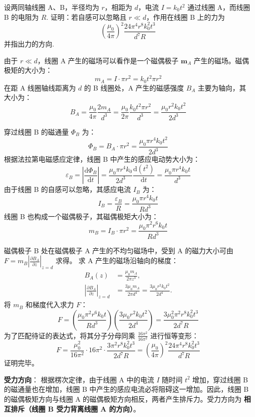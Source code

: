 \begin{exercise}\label{ex:18.5}
设两同轴线圈 A、B，半径均为 $r$，相距为 $d$，电流 $I = k_0 t^2$ 通过线圈 A，而线圈 B 的电阻为 $R$. 证明：若自感可以忽略且 $r \ll d$，作用在线圈 B 上的力为
$$ \left(\frac{\mu_0}{4\pi}\right)^2 \frac{24\pi^4 r^8 k_0^2 t^3}{d^7 R} $$
并指出力的方向.
\end{exercise}
\begin{solution}
由于 $r \ll d$，线圈 A 产生的磁场可以看作是一个磁偶极子 $\boldsymbol{m}_A$ 产生的磁场。磁偶极矩的大小为：
$$ m_A = I \cdot \pi r^2 = k_0 t^2 \pi r^2 $$
在距 A 线圈轴线距离为 $d$ 的 B 线圈处，A 产生的磁感强度 $B_A$ 主要为轴向，其大小为：
$$ B_A = \frac{\mu_0}{4\pi} \frac{2 m_A}{d^3} = \frac{\mu_0}{2\pi} \frac{k_0 t^2 \pi r^2}{d^3} = \frac{\mu_0 r^2 k_0 t^2}{2 d^3} $$

穿过线圈 B 的磁通量 $\Phi_B$ 为：
$$ \Phi_B = B_A \cdot \pi r^2 = \frac{\mu_0 \pi r^4 k_0 t^2}{2 d^3} $$
根据法拉第电磁感应定律，线圈 B 中产生的感应电动势大小为：
$$ \varepsilon_B = \left| \frac{\mathrm{d}\Phi_B}{\mathrm{d}t} \right| = \frac{\mu_0 \pi r^4 k_0}{2 d^3} \frac{\mathrm{d}(t^2)}{\mathrm{d}t} = \frac{\mu_0 \pi r^4 k_0 t}{d^3} $$
由于线圈 B 的自感可以忽略，其感应电流 $I_B$ 为：
$$ I_B = \frac{\varepsilon_B}{R} = \frac{\mu_0 \pi r^4 k_0 t}{R d^3} $$
线圈 B 也构成一个磁偶极子，其磁偶极矩大小为：
$$ m_B = I_B \cdot \pi r^2 = \frac{\mu_0 \pi^2 r^6 k_0 t}{R d^3} $$

磁偶极子 B 处在磁偶极子 A 产生的不均匀磁场中，受到 A 的磁力大小可由 $F = m_B \left| \frac{\partial B_A}{\partial z} \right|_{z=d}$ 求得。
求 A 产生的磁场沿轴向的梯度：
\[
\begin{aligned}
B_A(z)&=\frac{\mu_0m_A}{2\pi z^3},\\
\left|\frac{\partial B_A}{\partial z}\right|_{z=d}
  &=\frac{3\mu_0m_A}{2\pi d^4}
   =\frac{3\mu_0r^2k_0t^2}{2d^4}.
\end{aligned}
\]
将 $m_B$ 和梯度代入求力 $F$：
$$ F = \left( \frac{\mu_0 \pi^2 r^6 k_0 t}{R d^3} \right) \left( \frac{3\mu_0 r^2 k_0 t^2}{2 d^4} \right) = \frac{3 \mu_0^2 \pi^2 r^8 k_0^2 t^3}{2 d^7 R} $$
为了匹配待证的表达式，将其分子分母同乘 $\frac{16\pi^2}{16\pi^2}$ 进行恒等变形：
$$ F = \frac{\mu_0^2}{16\pi^2} \cdot 16\pi^2 \cdot \frac{3 \pi^2 r^8 k_0^2 t^3}{2 d^7 R} = \left(\frac{\mu_0}{4\pi}\right)^2 \frac{24\pi^4 r^8 k_0^2 t^3}{d^7 R} $$
证明完毕。

\textbf{受力方向}：
根据楞次定律，由于线圈 A 中的电流 $I$ 随时间 $t^2$ 增加，穿过线圈 B 的磁通量也在增加，线圈 B 中产生的感应电流必将阻碍这一增加。因此，线圈 B 的磁偶极矩方向与线圈 A 的磁偶极矩方向相反，两者产生排斥力。受力方向为 \textbf{相互排斥（线圈 B 受力背离线圈 A 的方向）}。
\end{solution}

